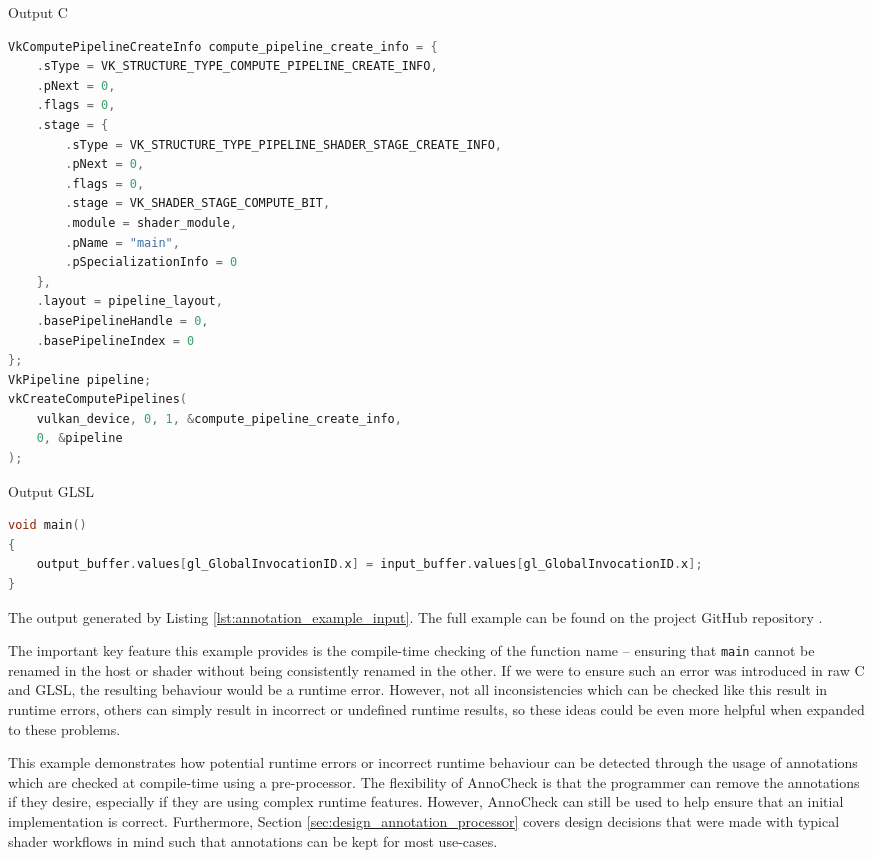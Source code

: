 \documentclass[a4paper,12pt,twoside,openright]{report}
\begin{document}
\begin{lstfloat}
\begin{center} Output C \end{center}
\begin{lstlisting}[language=C]
VkComputePipelineCreateInfo compute_pipeline_create_info = {
    .sType = VK_STRUCTURE_TYPE_COMPUTE_PIPELINE_CREATE_INFO,
    .pNext = 0,
    .flags = 0,
    .stage = {
        .sType = VK_STRUCTURE_TYPE_PIPELINE_SHADER_STAGE_CREATE_INFO,
        .pNext = 0,
        .flags = 0,
        .stage = VK_SHADER_STAGE_COMPUTE_BIT,
        .module = shader_module,
        .pName = "main",
        .pSpecializationInfo = 0
    },
    .layout = pipeline_layout,
    .basePipelineHandle = 0,
    .basePipelineIndex = 0
};
VkPipeline pipeline;
vkCreateComputePipelines(
    vulkan_device, 0, 1, &compute_pipeline_create_info,
    0, &pipeline
);
\end{lstlisting}
\begin{center} Output GLSL \end{center}
\begin{lstlisting}[language=C]
void main()
{
    output_buffer.values[gl_GlobalInvocationID.x] = input_buffer.values[gl_GlobalInvocationID.x];
}
\end{lstlisting}
\caption{The output generated by Listing \ref{lst:annotation_example_input}. The full
example can be found on the project GitHub repository \cite{ProjectSource}.}
\label{lst:annotation_example_output}
\end{lstfloat}


The important key feature this example provides is the compile-time checking of
the function name -- ensuring that \texttt{main} cannot be renamed in the host
or shader without being consistently renamed in the other. If we were to ensure
such an error was introduced in raw C and GLSL, the resulting behaviour would
be a runtime error. However, not all inconsistencies which can be checked like
this result in runtime errors, others can simply result in incorrect or
undefined runtime results, so these ideas could be even more helpful when
expanded to these problems.

This example demonstrates how potential runtime errors or incorrect runtime
behaviour can be detected through the usage of annotations which are checked at
compile-time using a pre-processor. The flexibility of AnnoCheck is that the
programmer can remove the annotations if they desire, especially if they are
using complex runtime features. However, AnnoCheck can still be used to help
ensure that an initial implementation is correct. Furthermore, Section
\ref{sec:design_annotation_processor} covers design decisions that were made
with typical shader workflows in mind such that annotations can be kept for
most use-cases.
\end{document}
